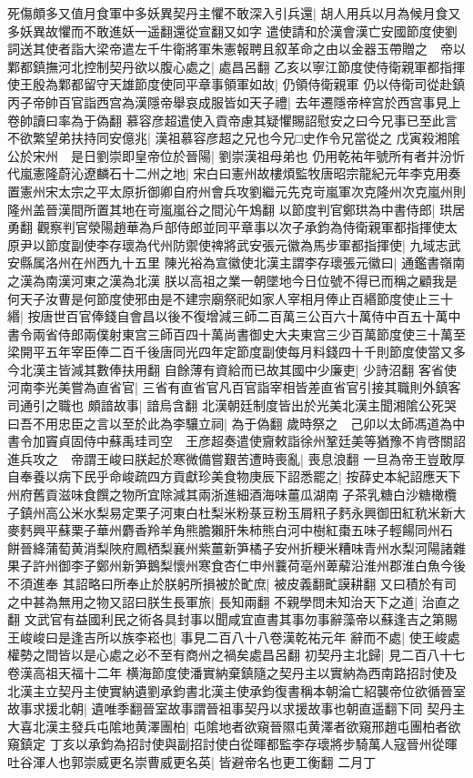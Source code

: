 死傷頗多又值月食軍中多妖異契丹主懼不敢深入引兵還|{
	胡人用兵以月為候月食又多妖異故懼而不敢進妖一遥翻還從宣翻又如字}
遣使請和於漢會漢亡安國節度使劉詞送其使者詣大梁帝遣左千牛衛將軍朱憲報聘且叙革命之由以金器玉帶贈之　帝以鄴都鎮撫河北控制契丹欲以腹心處之|{
	處昌呂翻}
乙亥以寧江節度使侍衛親軍都指揮使王殷為鄴都留守天雄節度使同平章事領軍如故|{
	仍領侍衛親軍}
仍以侍衛司從赴鎮　丙子帝帥百官詣西宫為漢隱帝舉哀成服皆如天子禮|{
	去年遷隱帝梓宫於西宫事見上卷帥讀曰率為于偽翻}
慕容彦超遣使入貢帝慮其疑懼賜詔慰安之曰今兄事已至此言不欲繁望弟扶持同安億兆|{
	漢祖慕容彦超之兄也今兄□史作令兄當從之}
戊寅殺湘隂公於宋州　是日劉崇即皇帝位於晉陽|{
	劉崇漢祖母弟也}
仍用乾祐年號所有者并汾忻代嵐憲隆蔚沁遼麟石十二州之地|{
	宋白曰憲州故樓煩監牧唐昭宗龍紀元年李克用奏置憲州宋太宗之平太原折御卿自府州會兵攻劉繼元先克岢嵐軍次克隆州次克嵐州則隆州盖晉漢間所置其地在岢嵐嵐谷之間沁午鴆翻}
以節度判官鄭珙為中書侍郎|{
	珙居勇翻}
觀察判官滎陽趙華為戶部侍郎並同平章事以次子承鈞為侍衛親軍都指揮使太原尹以節度副使李存瓌為代州防禦使禆將武安張元徽為馬步軍都指揮使|{
	九域志武安縣属洛州在州西九十五里}
陳光裕為宣徽使北漢主謂李存瓌張元徽曰|{
	通鑑書嶺南之漢為南漢河東之漢為北漢}
朕以高祖之業一朝墜地今日位號不得已而稱之顧我是何天子汝曹是何節度使邪由是不建宗廟祭祀如家人宰相月俸止百緡節度使止三十緡|{
	按唐世百官俸錢自會昌以後不復增減三師二百萬三公百六十萬侍中百五十萬中書令兩省侍郎兩僕射東宫三師百四十萬尚書御史大夫東宫三少百萬節度使三十萬至梁開平五年宰臣俸二百千後唐同光四年定節度副使每月料錢四十千則節度使當又多今北漢主皆減其數俸扶用翻}
自餘薄有資給而已故其國中少廉吏|{
	少詩沼翻}
客省使河南李光美嘗為直省官|{
	三省有直省官凡百官詣宰相皆差直省官引接其職則外鎮客司通引之職也}
頗諳故事|{
	諳烏含翻}
北漢朝廷制度皆出於光美北漢主聞湘隂公死哭曰吾不用忠臣之言以至於此為李驤立祠|{
	為于偽翻}
歲時祭之　己卯以太師馮道為中書令加竇貞固侍中蘇禹珪司空　王彦超奏遣使齎敕詣徐州鞏廷美等猶豫不肯啓關詔進兵攻之　帝謂王峻曰朕起於寒微備嘗艱苦遭時喪亂|{
	喪息浪翻}
一旦為帝王豈敢厚自奉養以病下民乎命峻疏四方貢獻珍美食物庚辰下詔悉罷之|{
	按薛史本紀詔應天下州府舊貢滋味食饌之物所宜除減其兩浙進細酒海味薑瓜湖南子茶乳糖白沙糖橄欖子鎮州高公米水梨易定栗子河東白杜梨米粉菉豆粉玉屑籸子麫永興御田紅秔米新大麥麫興平蘇栗子華州麝香羚羊角熊膽獺肝朱柿熊白河中樹紅棗五味子輕餳同州石餅晉絳蒲萄黄消梨陜府鳳栖梨襄州紫薑新笋橘子安州折粳米糟味青州水梨河陽諸雜果子許州御李子鄭州新笋鵝梨懷州寒食杏仁申州蘘荷亳州萆薢沿淮州郡淮白魚今後不須進奉}
其詔略曰所奉止於朕躬所損被於甿庶|{
	被皮義翻甿謨耕翻}
又曰積於有司之中甚為無用之物又詔曰朕生長軍旅|{
	長知兩翻}
不親學問未知治天下之道|{
	治直之翻}
文武官有益國利民之術各具封事以聞咸宜直書其事勿事辭藻帝以蘇逢吉之第賜王峻峻曰是逢吉所以族李崧也|{
	事見二百八十八卷漢乾祐元年}
辭而不處|{
	使王峻處權勢之間皆以是心處之必不至有商州之禍矣處昌呂翻}
初契丹主北歸|{
	見二百八十七卷漢高祖天福十二年}
横海節度使潘實納棄鎮隨之契丹主以實納為西南路招討使及北漢主立契丹主使實納遺劉承鈞書北漢主使承鈞復書稱本朝淪亡紹襲帝位欲循晉室故事求援北朝|{
	遺唯季翻晉室故事謂晉祖事契丹以求援故事也朝直遥翻下同}
契丹主大喜北漢主發兵屯隂地黄澤團柏|{
	屯隂地者欲窺晉隰屯黄澤者欲窺邢趙屯團柏者欲窺鎮定}
丁亥以承鈞為招討使與副招討使白從暉都監李存瓌將步騎萬人寇晉州從暉吐谷渾人也郭崇威更名崇曹威更名英|{
	皆避帝名也更工衡翻}
二月丁

